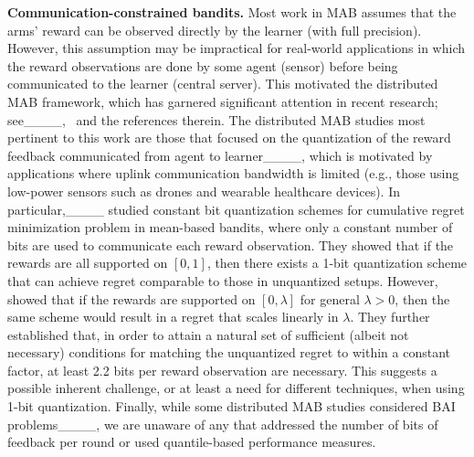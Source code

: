 \textbf{Communication-constrained bandits.}
Most work in MAB assumes that the arms' reward can be observed directly by the learner (with full precision).
However, this assumption may be impractical for real-world applications in which the reward observations are done by some agent (sensor) before being communicated to the learner (central server). 
This motivated the distributed MAB framework, which has garnered significant attention in recent research; see____,~\cite[Appendix A]{salgia2023distributed} and the references therein.
The distributed MAB studies most pertinent to this work are those that focused on the quantization of the reward feedback communicated from agent to learner____, which is motivated by applications where uplink communication bandwidth is limited (e.g., those using low-power sensors such as drones and wearable healthcare devices).
In particular,____ studied constant bit
quantization schemes for
cumulative regret minimization problem in mean-based bandits, where only a constant number of bits are used to communicate each reward observation.
They showed that if the rewards are all supported on $[0, 1]$, then there exists a 1-bit quantization scheme that can achieve 
regret comparable to those in unquantized setups.
However, \cite[Sec. 3]{hanna2022solving} showed that if the rewards are supported on $[0, \lambda]$ for general $\lambda > 0$, then the same scheme would result in a regret that scales linearly in $\lambda$.
They further established that, in order to attain a natural set of sufficient (albeit not necessary) conditions for matching the unquantized regret to within a constant factor, at least 2.2 bits per reward observation are necessary.  
This suggests a possible inherent challenge, or at least a need for different techniques, when using 1-bit quantization.  
Finally, while some distributed MAB studies considered BAI problems____, we are unaware of any that addressed the number of bits of feedback per round or used quantile-based performance measures.